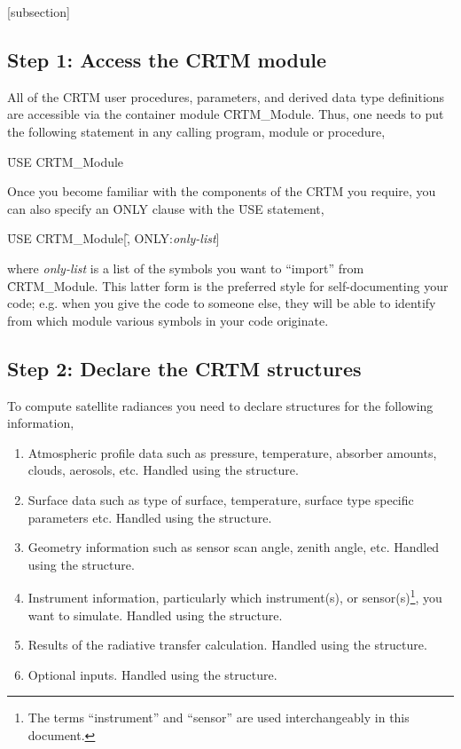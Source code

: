 [subsection]

\subsection{Step 1: Access the CRTM module}
All of the CRTM user procedures, parameters, and derived data type definitions are accessible via the container module \f{CRTM\_Module}. Thus, one needs to put the following statement in any calling program, module or procedure,

\qquad\f{USE CRTM\_Module}

Once you become familiar with the components of the CRTM you require, you can also specify an \f{ONLY} clause with the \f{USE} statement,

\qquad\f{USE CRTM\_Module}[\f{, ONLY:}\textit{only-list}]

where \textit{only-list} is a list of the symbols you want to ``import'' from \f{CRTM\_Module}. This latter form is the preferred style for self-documenting your code; e.g. when you give the code to someone else, they will be able to identify from which module various symbols in your code originate.

\subsection{Step 2: Declare the CRTM structures}
\label{sec:declare_step}
To compute satellite radiances you need to declare structures for the following information,\vspace{-2ex}
\begin{enumerate}
  \item Atmospheric profile data such as pressure, temperature, absorber amounts, clouds, aerosols, etc. Handled using the \Atmosphere{} structure.
  \item Surface data such as type of surface, temperature, surface type specific parameters etc. Handled using the \Surface{} structure.
  \item Geometry information such as sensor scan angle, zenith angle, etc. Handled using the \GeometryInfo{} structure.
  \item Instrument information, particularly which instrument(s), or sensor(s)\footnote{The terms ``instrument'' and ``sensor'' are used interchangeably in this document.}, you want to simulate. Handled using the \ChannelInfo{} structure.
  \item Results of the radiative transfer calculation. Handled using the \RTSolution{} structure.
  \item Optional inputs. Handled using the \Options{} structure.
\end{enumerate}

